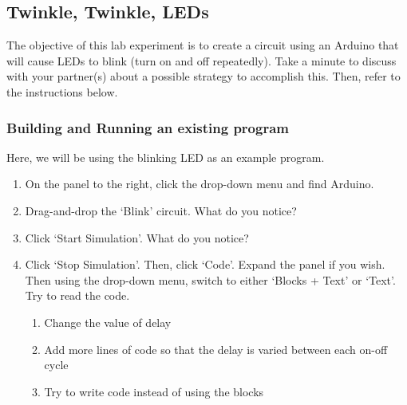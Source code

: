 \documentclass{article}
\begin{document}
\subsection{Twinkle, Twinkle, LEDs}
The objective of this lab experiment is to create a circuit using an Arduino that will cause LEDs to blink (turn on and off repeatedly). Take a minute to discuss with your partner(s) about a possible strategy to accomplish this. Then, refer to the instructions below.
\subsubsection{Building and Running an existing program}
Here, we will be using the blinking LED as an example program.
\begin{enumerate}
  \item On the panel to the right, click the drop-down menu and find Arduino.
  \item Drag-and-drop the ‘Blink’ circuit. What do you notice?
  \item Click ‘Start Simulation’. What do you notice?
  \item Click ‘Stop Simulation’. Then, click ‘Code’. Expand the panel if you wish. Then using the drop-down menu, switch to either ‘Blocks + Text’ or ‘Text’. Try to read the code.
  \begin{enumerate}
  \item Change the value of delay
  \item Add more lines of code so that the delay is varied between each on-off cycle
  \item Try to write code instead of using the blocks
\end{enumerate}
\end{enumerate}
\end{document}

